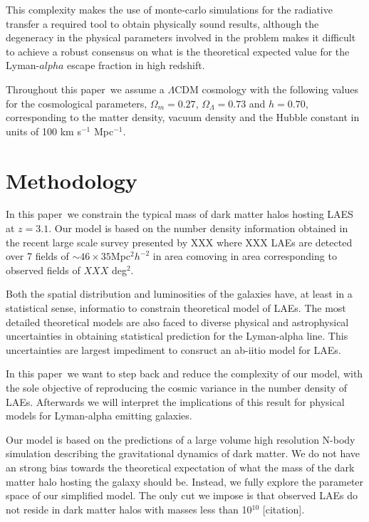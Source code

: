 \documentclass[usenatbib]{mn2e}
\newcommand{\documentname}{paper~}
\newcommand{\hMsun}{{\ifmmode{h^{-1}{\rm {M_{\odot}}}}\else{$h^{-1}{\rm{M_{\odot}}}$}\fi}}
\begin{document}
This complexity makes the use of monte-carlo simulations for the
radiative transfer a required tool to obtain physically sound results,
although the degeneracy in the physical parameters involved in the
problem makes it difficult to achieve a robust consensus on what is
the theoretical expected value for the Lyman-$alpha$ escape fraction
in high redshift. 


Throughout this \documentname we assume a $\Lambda$CDM cosmology with the
following values for the cosmological parameters, $\Omega_{m}=0.27$,
$\Omega_{\Lambda}=0.73$ and $h=0.70$, corresponding to the matter
density, vacuum density and the Hubble constant in units of 100 km
s$^{-1}$ Mpc$^{-1}$. 

\section{Methodology}
In this \documentname we constrain the typical mass of dark matter halos
hosting LAES at $z=3.1$. Our model is based on the number density
information obtained in the recent large scale survey presented by XXX
where XXX LAEs are detected over 7 fields of $\sim 46 \times
35$Mpc$^{2}h^{-2}$ in area comoving in area corresponding to observed
fields of $XXX$ deg$^{2}$.  

Both the spatial distribution and luminosities of the galaxies have,
at least in a statistical sense, informatio to constrain theoretical
model of LAEs. The most detailed theoretical models are also faced to
diverse physical and astrophysical uncertainties in obtaining
statistical prediction for the Lyman-alpha line. This uncertainties
are largest impediment to consruct an ab-iitio model for LAEs.  

In this \documentname we want to step back and reduce the complexity of our
model, with the sole objective of reproducing the cosmic variance in
the number density of LAEs. Afterwards we will interpret the
implications of this result for physical models for Lyman-alpha
emitting galaxies. 

Our model is based on the predictions of a large volume high
resolution N-body simulation describing the gravitational dynamics of
dark matter. We do not have an strong bias towards the theoretical
expectation of what the mass of the dark matter halo hosting the
galaxy should be.  Instead, we fully explore the parameter space of
our simplified model. The only cut we impose is that observed LAEs do
not reside in dark matter halos with masses less than 10$^{10}$
\hMsun [citation].  
\end{document}
